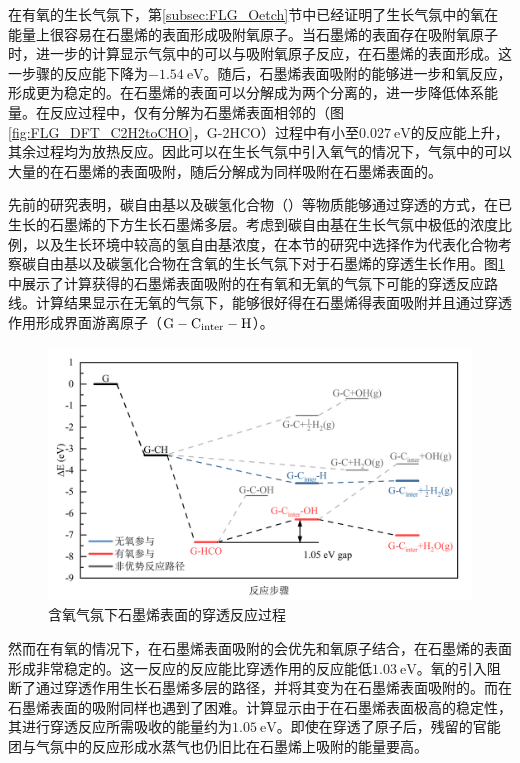 在有氧的生长气氛下，第\ref{subsec:FLG_Oetch}节中已经证明了生长气氛中的氧在能量上很容易在石墨烯的表面形成吸附氧原子。当石墨烯的表面存在吸附氧原子时，进一步的计算显示气氛中的可以与吸附氧原子反应，在石墨烯的表面形成。这一步骤的反应能下降为$\SI{-1.54}{\electronvolt}$。随后，石墨烯表面吸附的能够进一步和氧反应，形成更为稳定的。在石墨烯的表面可以分解成为两个分离的，进一步降低体系能量。在反应过程中，仅有分解为石墨烯表面相邻的（图\ref{fig:FLG_DFT_C2H2toCHO}，G-2HCO）过程中有小至$\SI{0.027}{\electronvolt}$的反应能上升，其余过程均为放热反应。因此可以在生长气氛中引入氧气的情况下，气氛中的可以大量的在石墨烯的表面吸附，随后分解成为同样吸附在石墨烯表面的。


先前的研究表明，碳自由基以及碳氢化合物（）等物质能够通过穿透的方式，在已生长的石墨烯的下方生长石墨烯多层。考虑到碳自由基在生长气氛中极低的浓度比例，以及生长环境中较高的氢自由基浓度，在本节的研究中选择作为代表化合物考察碳自由基以及碳氢化合物在含氧的生长气氛下对于石墨烯的穿透生长作用。图\ref{fig:FLG_DFT_CHpene}中展示了计算获得的石墨烯表面吸附的在有氧和无氧的气氛下可能的穿透反应路线。计算结果显示在无氧的气氛下，能够很好得在石墨烯得表面吸附并且通过穿透作用形成界面游离原子（$\rm G-C_{inter}-H$）。

\begin{figure}[htb]
    \includegraphics{pic/FLG_DFT_CHpene.png}
    \caption{含氧气氛下石墨烯表面的穿透反应过程}
    \label{fig:FLG_DFT_CHpene}
\end{figure}

然而在有氧的情况下，在石墨烯表面吸附的会优先和氧原子结合，在石墨烯的表面形成非常稳定的。这一反应的反应能比穿透作用的反应能低$\SI{1.03}{\electronvolt}$。氧的引入阻断了通过穿透作用生长石墨烯多层的路径，并将其变为在石墨烯表面吸附的。而在石墨烯表面的吸附同样也遇到了困难。计算显示由于在石墨烯表面极高的稳定性，其进行穿透反应所需吸收的能量约为$\SI{1.05}{\electronvolt}$。即使在穿透了原子后，残留的官能团与气氛中的反应形成水蒸气也仍旧比在石墨烯上吸附的能量要高。

